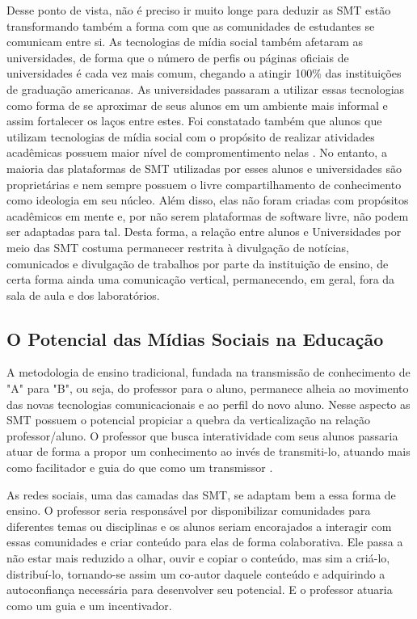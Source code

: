 
Desse ponto de vista, não é preciso ir muito longe para deduzir as SMT estão
transformando também a forma com que as comunidades de estudantes se comunicam
entre si. As tecnologias de mídia social também afetaram as universidades, de
forma que o número de perfis ou páginas oficiais de universidades é cada vez mais
comum, chegando a atingir 100\% das instituições de graduação americanas.
%
As universidades passaram a utilizar essas tecnologias como forma de se aproximar
de seus alunos em um ambiente mais informal e assim fortalecer os laços entre
estes. Foi constatado também que alunos que utilizam tecnologias de mídia
social com o propósito de realizar atividades acadêmicas possuem maior nível de
compromentimento nelas \cite{ccsse2009}.
%
No entanto, a maioria das plataformas de SMT utilizadas por esses alunos e
universidades são proprietárias e nem sempre possuem o livre compartilhamento de
conhecimento como ideologia em seu núcleo. Além disso, elas não foram criadas com
propósitos acadêmicos em mente e, por não serem plataformas de software livre,
não podem ser adaptadas para tal.
%
Desta forma, a relação entre alunos e Universidades por meio das SMT costuma
permanecer restrita à divulgação de notícias, comunicados e divulgação de
trabalhos por parte da instituição de ensino, de certa forma ainda uma
comunicação vertical, permanecendo, em geral, fora da sala de aula e dos
laboratórios.

\subsection{O Potencial das Mídias Sociais na Educação}

A metodologia de ensino tradicional, fundada na transmissão de conhecimento de
"A" para "B", ou seja, do professor para o aluno, permanece alheia ao movimento
das novas tecnologias comunicacionais e ao perfil do novo aluno. Nesse aspecto
as SMT possuem o potencial propiciar a quebra da verticalização na relação
professor/aluno. O professor que busca interatividade com seus alunos passaria
atuar de forma a propor um conhecimento ao invés de transmiti-lo,  atuando mais
como facilitador e guia do que como um transmissor \cite{silva2002}.

As redes sociais, uma das camadas das SMT, se adaptam bem a essa forma de
ensino. O professor seria responsável por disponibilizar comunidades para
diferentes temas ou disciplinas e os alunos seriam encorajados a interagir com
essas comunidades e criar conteúdo para elas de forma colaborativa. Ele passa
a não estar mais reduzido a olhar, ouvir e copiar o conteúdo, mas sim a criá-lo,
distribuí-lo, tornando-se assim um co-autor daquele conteúdo e adquirindo a
autoconfiança necessária para desenvolver seu potencial. E o professor
atuaria como um guia e um incentivador.

